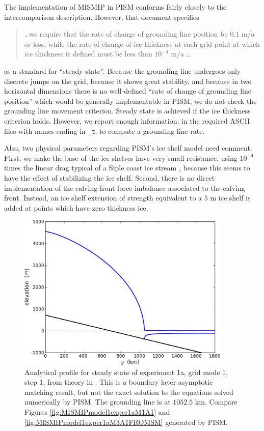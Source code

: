 \documentclass[11pt,final]{amsart}
\begin{document}
The implementation of MISMIP in PISM conforms fairly closely to the intercomparison description.  However, that document specifies
\begin{quotation}
\dots we require that the rate of change of grounding line position be $0.1$ m/a or less, while the rate of change of ice thickness at each grid point at which ice thickness is defined must be less than $10^{-4}$ m/a \dots
\end{quotation}
as a standard for ``steady state''.  Because the grounding line undergoes only discrete jumps on the grid, because it shows great stability, and because in two horizontal dimensions there is no well-defined ``rate of change of grounding line position'' which would be generally implementable in PISM, we do not check the grounding line movement criterion.  Steady state is achieved if the ice thickness criterion holds.  However, we report enough information, in the required ASCII files with names ending in \verb|_t|, to compute a grounding line rate.

Also, two physical parameters regarding PISM's ice shelf model need comment.  First, we make the base of the ice shelves have very small resistance, using $10^{-4}$ times the linear drag typical of a Siple coast ice stream \cite{HulbeMacAyeal}, because this seems to have the effect of stabilizing the ice shelf.  Second, there is no direct implementation of the calving front force imbalance associated to the calving front.  Instead, an ice shelf extension of strength equivalent to a $5$ m ice shelf is added at points which have zero thickness ice.


\begin{figure}[ht]
\includegraphics[width=4.0in,keepaspectratio=true]{figs/SM_1a_A1}
\caption{Analytical profile for steady state of experiment 1a, grid mode 1, step 1, from theory in \cite{SchoofMarine1}.  This is a boundary layer asymptotic matching result, but not the exact solution to the equations solved numerically by PISM.  The grounding line is at $1052.5$ km.  Compare Figures \ref{fig:MISMIPmodel1exper1aM1A1} and \ref{fig:MISMIPmodel1exper1aM3A1FROMSM} generated by PISM.}
\label{fig:SMexper1aM1A1}
\end{figure}
\end{document}
